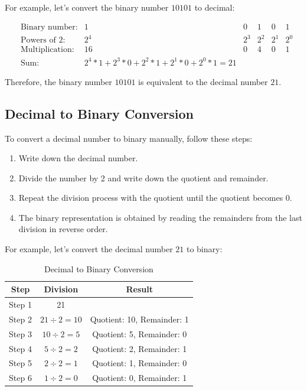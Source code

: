 \documentclass[12pt]{book}
\begin{document}
For example, let's convert the binary number $10101$ to decimal:

\begin{align*}
& \text{Binary number:} & 1 & 0 & 1 & 0 & 1 \\
& \text{Powers of 2:} & 2^4 & 2^3 & 2^2 & 2^1 & 2^0 \\
& \text{Multiplication:} & 16 & 0 & 4 & 0 & 1 \\
& \text{Sum:} & 2^4*1 + 2^3*0 + 2^2*1 + 2^1*0 + 2^0*1 = 21
\end{align*}

Therefore, the binary number $10101$ is equivalent to the decimal number $21$.

\subsection{Decimal to Binary Conversion}

To convert a decimal number to binary manually, follow these steps:

\begin{enumerate}
\item Write down the decimal number.
\item Divide the number by 2 and write down the quotient and remainder.
\item Repeat the division process with the quotient until the quotient becomes 0.
\item The binary representation is obtained by reading the remainders from the last division in reverse order.
\end{enumerate}

For example, let's convert the decimal number $21$ to binary:

\begin{table}[h]
\centering
\caption{Decimal to Binary Conversion}
\begin{tabular}{|c|c|c|}
\hline
\textbf{Step} & \textbf{Division} & \textbf{Result} \\
\hline
Step 1 & 21 & \\
\hline
Step 2 & $21 \div 2 = 10$ & Quotient: 10, Remainder: 1 \\
\hline
Step 3 & $10 \div 2 = 5$ & Quotient: 5, Remainder: 0 \\
\hline
Step 4 & $5 \div 2 = 2$ & Quotient: 2, Remainder: 1 \\
\hline
Step 5 & $2 \div 2 = 1$ & Quotient: 1, Remainder: 0 \\
\hline
Step 6 & $1 \div 2 = 0$ & Quotient: 0, Remainder: 1 \\
\hline
\end{tabular}
\end{table}
\end{document}

